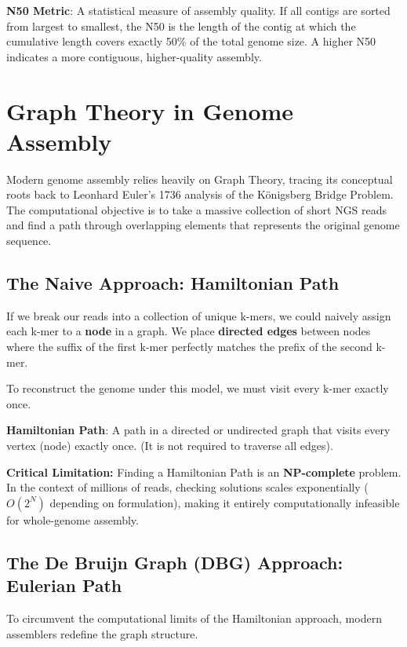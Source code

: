 \begin{important}
    \textbf{N50 Metric}: A statistical measure of assembly quality. If all contigs are sorted from largest to smallest, the N50 is the length of the contig at which the cumulative length covers exactly 50\% of the total genome size. A higher N50 indicates a more contiguous, higher-quality assembly.
\end{important}

\section{Graph Theory in Genome Assembly}
Modern genome assembly relies heavily on Graph Theory, tracing its conceptual roots back to Leonhard Euler's 1736 analysis of the Königsberg Bridge Problem. The computational objective is to take a massive collection of short NGS reads and find a path through overlapping elements that represents the original genome sequence.

\subsection{The Naive Approach: Hamiltonian Path}
If we break our reads into a collection of unique k-mers, we could naively assign each k-mer to a \textbf{node} in a graph. We place \textbf{directed edges} between nodes where the suffix of the first k-mer perfectly matches the prefix of the second k-mer.

To reconstruct the genome under this model, we must visit every k-mer exactly once.
\begin{important}
    \textbf{Hamiltonian Path}: A path in a directed or undirected graph that visits every vertex (node) exactly once. (It is not required to traverse all edges).
\end{important}

\sta \textbf{Critical Limitation:} Finding a Hamiltonian Path is an \textbf{NP-complete} problem. In the context of millions of reads, checking solutions scales exponentially ($O(2^N)$ depending on formulation), making it entirely computationally infeasible for whole-genome assembly.

\subsection{The De Bruijn Graph (DBG) Approach: Eulerian Path}
To circumvent the computational limits of the Hamiltonian approach, modern assemblers redefine the graph structure.

